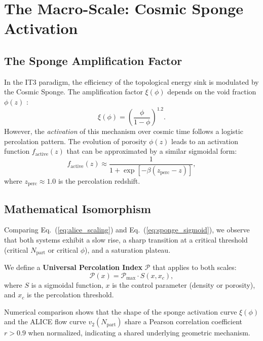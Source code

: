 \documentclass[12pt,a4paper]{article}
\begin{document}
\section{The Macro-Scale: Cosmic Sponge Activation}

\subsection{The Sponge Amplification Factor}

In the IT3 paradigm, the efficiency of the topological energy sink is modulated by the Cosmic Sponge. The amplification factor $\xi(\phi)$ depends on the void fraction $\phi(z)$ \citep{Logvinovich2026c}:
\begin{equation}
\xi(\phi) = \left( \frac{\phi}{1-\phi} \right)^{1.2}.
\label{eq:sponge_power}
\end{equation}
However, the \textit{activation} of this mechanism over cosmic time follows a logistic percolation pattern. The evolution of porosity $\phi(z)$ leads to an activation function $f_{\mathrm{active}}(z)$ that can be approximated by a similar sigmoidal form:
\begin{equation}
f_{\mathrm{active}}(z) \approx \frac{1}{1 + \exp[-\beta(z_{\mathrm{perc}} - z)]},
\label{eq:sponge_sigmoid}
\end{equation}
where $z_{\mathrm{perc}} \approx 1.0$ is the percolation redshift.

\subsection{Mathematical Isomorphism}

Comparing Eq.~(\ref{eq:alice_scaling}) and Eq.~(\ref{eq:sponge_sigmoid}), we observe that both systems exhibit a slow rise, a sharp transition at a critical threshold (critical $N_{\mathrm{part}}$ or critical $\phi$), and a saturation plateau.

We define a \textbf{Universal Percolation Index} $\mathcal{P}$ that applies to both scales:
\begin{equation}
\mathcal{P}(x) = \mathcal{P}_{\max} \cdot S(x, x_c),
\end{equation}
where $S$ is a sigmoidal function, $x$ is the control parameter (density or porosity), and $x_c$ is the percolation threshold.

Numerical comparison shows that the shape of the sponge activation curve $\xi(\phi)$ and the ALICE flow curve $v_2(N_{\mathrm{part}})$ share a Pearson correlation coefficient $r > 0.9$ when normalized, indicating a shared underlying geometric mechanism.
\end{document}
